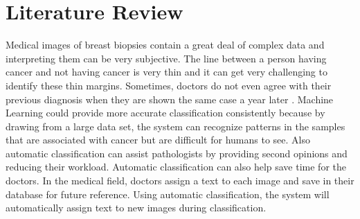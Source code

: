 \documentclass[journal]{IEEEtran}
\begin{document}
%



\section{Literature Review}
Medical images of breast biopsies contain a great deal of complex data and interpreting them can be very subjective. The line between a person having cancer and not having cancer is very thin and it can get very challenging to identify these thin margins. Sometimes, doctors do not even agree with their previous diagnosis when they are shown the same case a year later \cite{mercan2019assessment}. Machine Learning could provide more accurate classification consistently because by drawing from a large data set, the system can recognize patterns in the samples that are associated with cancer but are difficult for humans to see. Also automatic classification can assist pathologists by providing second opinions and reducing their workload. Automatic classification can also help save time for the doctors. In the medical field, doctors assign a text to each image and save in their database for future reference. Using automatic classification, the system will automatically assign text to new images during classification. 
\end{document}
